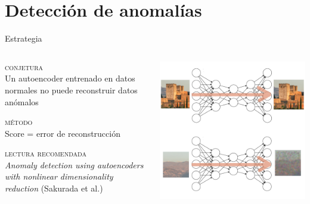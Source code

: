 \documentclass[13.5pt,aspectratio=169]{beamer}
\begin{document}
     \section{Detección de anomalías}
     
     \begin{frame}{Estrategia}
      \begin{columns}
         \begin{fullpageitemize}
            \item \textsc{\color{colorblue}conjetura}\\Un autoencoder entrenado en datos normales no puede reconstruir datos anómalos\vspace{1em}
            \item \textsc{\color{colorblue}método}\\Score = error de reconstrucción\vspace{1em}
            \item \textsc{\color{colorblue}lectura recomendada}\\
            {\small\textit{Anomaly detection using autoencoders with nonlinear dimensionality reduction} (Sakurada {\scriptsize et al.})}
         \end{fullpageitemize}
         \includegraphics[width=\linewidth]{images/autoencoders-anom.png}
      \end{columns}
      

     \end{frame}
     
\end{document}
